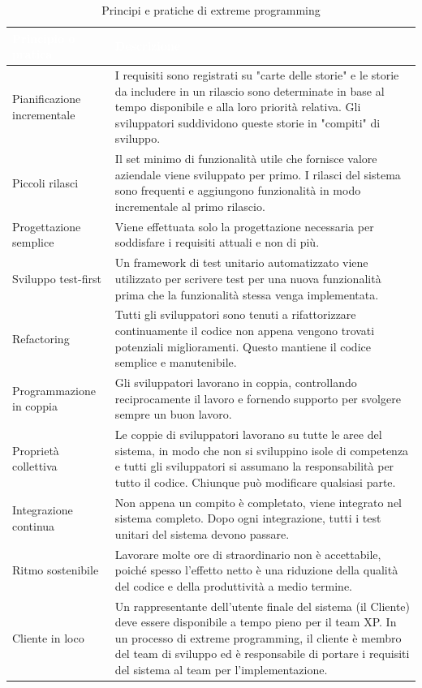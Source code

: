 \begin{table}[ht]
\centering
{}
\begin{tabular}{|p{5cm}|p{10cm}|}
\hline
\rowcolor{headerblue}
\textbf{\textcolor{white}{Principio o pratica}} & \textbf{\textcolor{white}{Descrizione}} \\
\hline
Pianificazione incrementale & I requisiti sono registrati su "carte delle storie" e le storie da includere in un rilascio sono determinate in base al tempo disponibile e alla loro priorità relativa. Gli sviluppatori suddividono queste storie in "compiti" di sviluppo.
\\\hline Piccoli rilasci & Il set minimo di funzionalità utile che fornisce valore aziendale viene sviluppato per primo. I rilasci del sistema sono frequenti e aggiungono funzionalità in modo incrementale al primo rilascio.
\\\hline Progettazione semplice & Viene effettuata solo la progettazione necessaria per soddisfare i requisiti attuali e non di più.
\\\hline Sviluppo test-first & Un framework di test unitario automatizzato viene utilizzato per scrivere test per una nuova funzionalità prima che la funzionalità stessa venga implementata.
\\\hline Refactoring & Tutti gli sviluppatori sono tenuti a rifattorizzare continuamente il codice non appena vengono trovati potenziali miglioramenti. Questo mantiene il codice semplice e manutenibile.
\\\hline Programmazione in coppia & Gli sviluppatori lavorano in coppia, controllando reciprocamente il lavoro e fornendo supporto per svolgere sempre un buon lavoro.
\\\hline Proprietà collettiva & Le coppie di sviluppatori lavorano su tutte le aree del sistema, in modo che non si sviluppino isole di competenza e tutti gli sviluppatori si assumano la responsabilità per tutto il codice. Chiunque può modificare qualsiasi parte.
\\\hline Integrazione continua & Non appena un compito è completato, viene integrato nel sistema completo. Dopo ogni integrazione, tutti i test unitari del sistema devono passare.
\\\hline Ritmo sostenibile & Lavorare molte ore di straordinario non è accettabile, poiché spesso l'effetto netto è una riduzione della qualità del codice e della produttività a medio termine.
\\\hline Cliente in loco & Un rappresentante dell'utente finale del sistema (il Cliente) deve essere disponibile a tempo pieno per il team XP. In un processo di extreme programming, il cliente è membro del team di sviluppo ed è responsabile di portare i requisiti del sistema al team per l'implementazione.
\\\hline 
\end{tabular}
\caption{Principi e pratiche di extreme programming}
\label{tab:principi-pratiche-extreme-programming}
\end{table}

